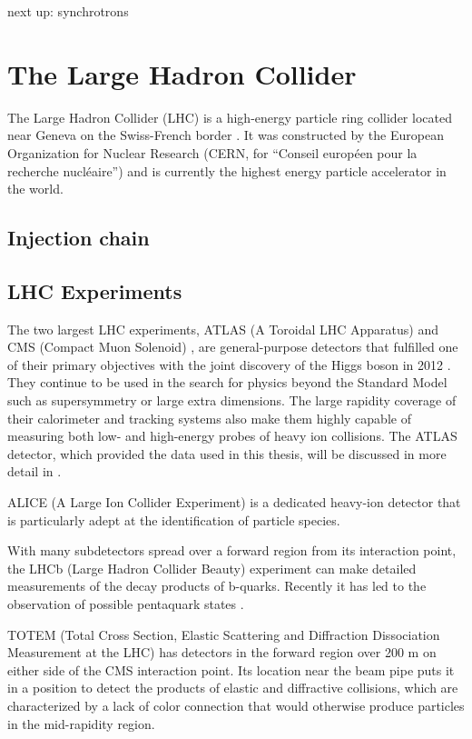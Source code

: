 next up: synchrotrons

\section{The Large Hadron Collider}

The Large Hadron Collider (LHC) is a high-energy particle ring collider located near Geneva on the Swiss-French border \cite{LHCMachine}. It was constructed by the European Organization for Nuclear Research (CERN, for ``Conseil européen pour la recherche nucléaire'') and is currently the highest energy particle accelerator in the world.

\subsection{Injection chain}
\subsection{LHC Experiments}
The two largest LHC experiments, ATLAS (A Toroidal LHC Apparatus) \cite{Aad:2008zzm} and CMS (Compact Muon Solenoid) \cite{Chatrchyan:2008aa}, are general-purpose detectors that fulfilled one of their primary objectives with the joint discovery of the Higgs boson in 2012 \cite{Aad:2012tfa,Chatrchyan:2012xdj}. They continue to be used in the search for physics beyond the Standard Model such as supersymmetry or large extra dimensions. The large rapidity coverage of their calorimeter and tracking systems also make them highly capable of measuring both low- and high-energy probes of heavy ion collisions. The ATLAS detector, which provided the data used in this thesis, will be discussed in more detail in \Sect{\ref{sec:atlas}}.

ALICE (A Large Ion Collider Experiment) \cite{Aamodt:2008zz} is a dedicated heavy-ion detector that is particularly adept at the identification of particle species.

With many subdetectors spread over a forward region from its interaction point, the LHCb (Large Hadron Collider Beauty) experiment \cite{Alves:2008zz} can make detailed measurements of the decay products of b-quarks. Recently it has led to the observation of possible pentaquark states \cite{Aaij:2015tga}.

TOTEM (Total Cross Section, Elastic Scattering and Diffraction Dissociation Measurement at the LHC) \cite{Anelli:2008zza} has detectors in the forward region over 200 m on either side of the CMS interaction point. Its location near the beam pipe puts it in a position to detect the products of elastic and diffractive collisions, which are characterized by a lack of color connection that would otherwise produce particles in the mid-rapidity region.

